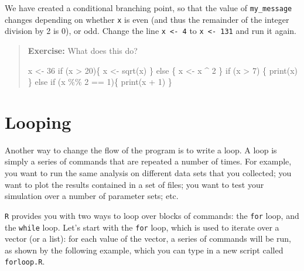 \documentclass[
  letterpaper,
  DIV=11,
  numbers=noendperiod]{scrreprt}
\newenvironment{Shaded}{\begin{snugshade}}{\end{snugshade}}
\newcommand{\ControlFlowTok}[1]{\textcolor[rgb]{0.00,0.23,0.31}{#1}}
\newcommand{\DecValTok}[1]{\textcolor[rgb]{0.68,0.00,0.00}{#1}}
\newcommand{\FunctionTok}[1]{\textcolor[rgb]{0.28,0.35,0.67}{#1}}
\newcommand{\NormalTok}[1]{\textcolor[rgb]{0.00,0.23,0.31}{#1}}
\newcommand{\OtherTok}[1]{\textcolor[rgb]{0.00,0.23,0.31}{#1}}
\newcommand{\SpecialCharTok}[1]{\textcolor[rgb]{0.37,0.37,0.37}{#1}}
\begin{document}
We have created a conditional branching point, so that the value of
\texttt{my\_message} changes depending on whether \texttt{x} is even
(and thus the remainder of the integer division by 2 is 0), or odd.
Change the line \texttt{x\ \textless{}-\ 4} to
\texttt{x\ \textless{}-\ 131} and run it again.

\begin{quote}
\textbf{Exercise:} What does this do?

\begin{Shaded}
\begin{Highlighting}[]
\NormalTok{x }\OtherTok{\textless{}{-}} \DecValTok{36}
\ControlFlowTok{if}\NormalTok{ (x }\SpecialCharTok{\textgreater{}} \DecValTok{20}\NormalTok{)\{}
\NormalTok{  x }\OtherTok{\textless{}{-}} \FunctionTok{sqrt}\NormalTok{(x)}
\NormalTok{\} }\ControlFlowTok{else}\NormalTok{ \{}
\NormalTok{  x }\OtherTok{\textless{}{-}}\NormalTok{ x }\SpecialCharTok{\^{}} \DecValTok{2}
\NormalTok{\}}
\ControlFlowTok{if}\NormalTok{ (x }\SpecialCharTok{\textgreater{}} \DecValTok{7}\NormalTok{) \{}
  \FunctionTok{print}\NormalTok{(x)}
\NormalTok{\} }\ControlFlowTok{else} \ControlFlowTok{if}\NormalTok{ (x }\SpecialCharTok{\%\%} \DecValTok{2} \SpecialCharTok{==} \DecValTok{1}\NormalTok{)\{}
  \FunctionTok{print}\NormalTok{(x }\SpecialCharTok{+} \DecValTok{1}\NormalTok{)}
\NormalTok{\}}
\end{Highlighting}
\end{Shaded}
\end{quote}

\hypertarget{looping}{%
\section{Looping}\label{looping}}

Another way to change the flow of the program is to write a loop. A loop
is simply a series of commands that are repeated a number of times. For
example, you want to run the same analysis on different data sets that
you collected; you want to plot the results contained in a set of files;
you want to test your simulation over a number of parameter sets; etc.

\texttt{R} provides you with two ways to loop over blocks of commands:
the \texttt{for} loop, and the \texttt{while} loop. Let's start with the
\texttt{for} loop, which is used to iterate over a vector (or a list):
for each value of the vector, a series of commands will be run, as shown
by the following example, which you can type in a new script called
\texttt{forloop.R}.
\end{document}
